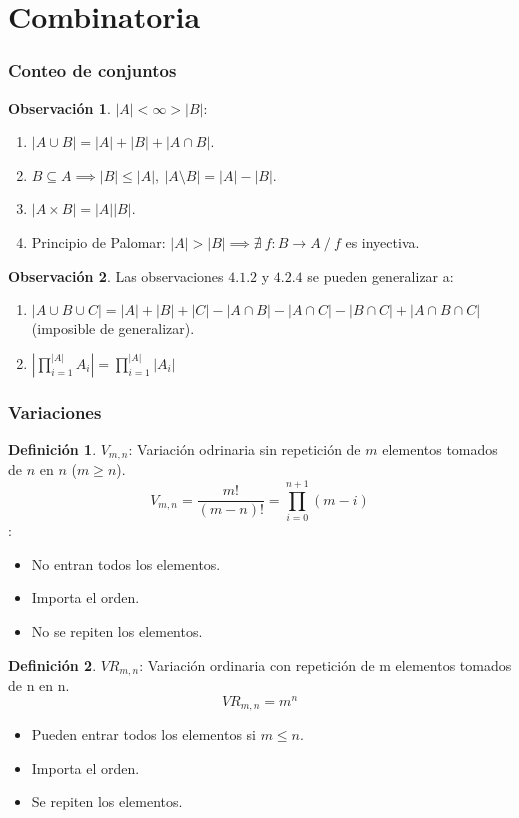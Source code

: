 \documentclass[10pt,a4paper]{article}
\theoremstyle{definition}
\newtheorem{definition}{Definición}[section]
\newtheorem{obs}{Observación}[section]
\begin{document}
\part{Combinatoria}
\section{Conteo de conjuntos}
\begin{obs} $|A|<\infty>|B|:$
	\begin{enumerate}
		\item $|A\cup B| = |A| + |B| + |A\cap B|$.
		\item $B\subseteq A \implies |B|\leq|A|,\:|A\setminus B| = |A|-|B|$.
		\item $|A\times B| = |A||B|$.
		\item Principio de Palomar: $|A|>|B|\implies\nexists\:f:B\to A\:/\:f $ es inyectiva.
		\end{enumerate}
\end{obs}
\begin{obs}
	Las observaciones $4.1.2$ y $4.2.4$ se pueden generalizar a:
	\begin{enumerate}
		\item $|A\cup B \cup C| = |A|+|B|+|C|-|A\cap B| - |A\cap C| - |B\cap C| + |A\cap B\cap C|$ (imposible de generalizar).
		\item $|\prod_{i=1}^{\scriptscriptstyle |A|}A_i| = \prod_{i=1}^{\scriptscriptstyle |A|}|A_i|$
	\end{enumerate}
\end{obs}

\section{Variaciones}
\begin{definition}
	$V_{m,n}$: Variación odrinaria sin repetición de $m$ elementos tomados de $n$ en $n$ ($m\geq n$).
	\[V_{m,n} = \frac{m!}{(m-n)!} = \prod_{i=0}^{n+1}(m-i)\]:
	\begin{itemize}
		\item No entran todos los elementos.
		\item Importa el orden.
		\item No se repiten los elementos.
	\end{itemize}
\end{definition}
\begin{definition}
	$VR_{m,n}$: Variación ordinaria con repetición de m elementos tomados de n en n.
	\[VR_{m,n} = m^n\]
\begin{itemize}
	\item Pueden entrar todos los elementos si $m\leq n$.
	\item Importa el orden.
	\item Se repiten los elementos.
	\end{itemize}
\end{definition}
\end{document}
